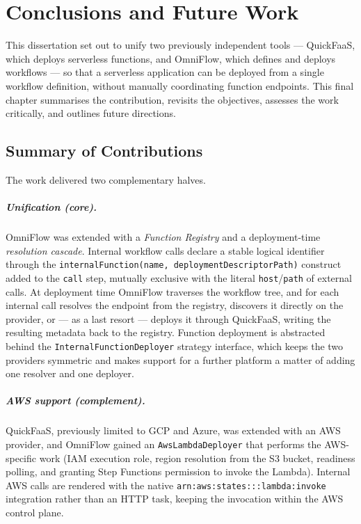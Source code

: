 \chapter{Conclusions and Future Work}
\label{cha:conclusions}

This dissertation set out to unify two previously independent tools --- QuickFaaS, which deploys
serverless functions, and OmniFlow, which defines and deploys workflows --- so that a serverless
application can be deployed from a single workflow definition, without manually coordinating
function endpoints. This final chapter summarises the contribution, revisits the objectives,
assesses the work critically, and outlines future directions.

\section{Summary of Contributions}
\label{sec:concl-contributions}

The work delivered two complementary halves.

\paragraph{Unification (core).}
OmniFlow was extended with a \emph{Function Registry} and a deployment-time \emph{resolution
cascade}. Internal workflow calls declare a stable logical identifier through the
\texttt{internalFunction(name, deploymentDescriptorPath)} construct added to the \texttt{call}
step, mutually exclusive with the literal \texttt{host}/\texttt{path} of external calls. At
deployment time OmniFlow traverses the workflow tree, and for each internal call resolves the
endpoint from the registry, discovers it directly on the provider, or --- as a last resort ---
deploys it through QuickFaaS, writing the resulting metadata back to the registry. Function
deployment is abstracted behind the \texttt{InternalFunctionDeployer} strategy interface, which
keeps the two providers symmetric and makes support for a further platform a matter of adding one
resolver and one deployer.

\paragraph{AWS support (complement).}
QuickFaaS, previously limited to GCP and Azure, was extended with an AWS provider, and OmniFlow
gained an \texttt{AwsLambdaDeployer} that performs the AWS-specific work (IAM execution role,
region resolution from the S3 bucket, readiness polling, and granting Step Functions permission to
invoke the Lambda). Internal AWS calls are rendered with the native
\texttt{arn:aws:states:::lambda:invoke} integration rather than an HTTP task, keeping the
invocation within the AWS control plane.

